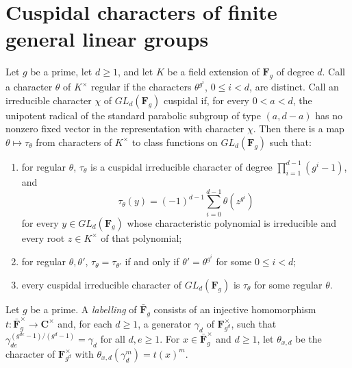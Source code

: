 \section{Cuspidal characters of finite general linear groups}\label{section-lit-green}

\begin{theorem}\label{lit-green-cuspidal}
Let $g$ be a prime, let $d\ge1$, and let $K$ be a field extension of
$\mathbf F_g$ of degree $d$. Call a character $\theta$ of $K^\times$ regular if
the characters $\theta^{g^i}$, $0\le i<d$, are distinct. Call an irreducible
character $\chi$ of $GL_d(\mathbf F_g)$ cuspidal if, for every
$0<a<d$, the unipotent radical of the standard parabolic subgroup of type
$(a,d-a)$ has no nonzero fixed vector in the representation with
character $\chi$. Then there is a map $\theta\mapsto\tau_\theta$ from
characters of $K^\times$ to class functions on $GL_d(\mathbf F_g)$ such that:
\begin{enumerate}
\item for regular $\theta$, $\tau_\theta$ is a cuspidal irreducible character
  of degree $\prod_{i=1}^{d-1}(g^i-1)$, and
  \[
  \tau_\theta(y)=(-1)^{d-1}\sum_{i=0}^{d-1}\theta(z^{g^i})
  \]
  for every $y\in GL_d(\mathbf F_g)$ whose characteristic polynomial is
  irreducible and every root $z\in K^\times$ of that polynomial;
\item for regular $\theta,\theta'$, $\tau_\theta=\tau_{\theta'}$ if and only if
  $\theta'=\theta^{g^i}$ for some $0\le i<d$;
\item every cuspidal irreducible character of $GL_d(\mathbf F_g)$ is
  $\tau_\theta$ for some regular $\theta$.
\end{enumerate}
\end{theorem}

\begin{definition}\label{lit-labelling}
Let $g$ be a prime. A \emph{labelling} of $\bar{\mathbf F}_g$ consists of an
injective homomorphism $t:\bar{\mathbf F}_g^\times\to\mathbf C^\times$ and, for
each $d\ge1$, a generator $\gamma_d$ of $\mathbf F_{g^d}^\times$, such that
$\gamma_{de}^{(g^{de}-1)/(g^d-1)}=\gamma_d$ for all $d,e\ge1$. For
$x\in\bar{\mathbf F}_g^\times$ and $d\ge1$, let $\theta_{x,d}$ be the
character of $\mathbf F_{g^d}^\times$ with $\theta_{x,d}(\gamma_d^m)=t(x)^m$.
\end{definition}


